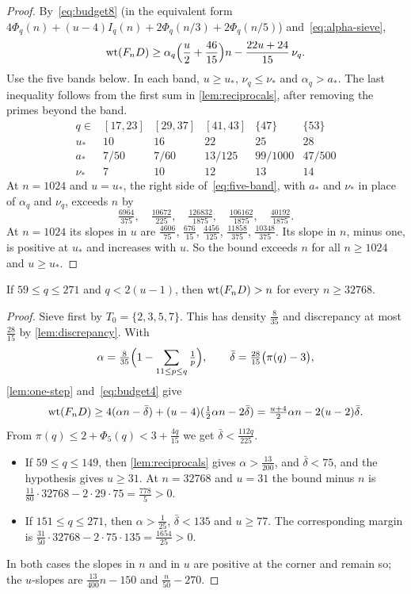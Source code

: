\begin{proof}
By~\eqref{eq:budget8} (in the equivalent form $4\Phi_q(n)+(u-4)I_q(n)+2\Phi_q(n/3)+2\Phi_q(n/5)$) and~\eqref{eq:alpha-sieve},
\begin{equation}\label{eq:five-band}
 \operatorname{wt}(F_nD)\ge\alpha_q\Bigl(\frac u2+\frac{46}{15}\Bigr)n-\frac{22u+24}{15}\,\nu_q .
\end{equation}
Use the five bands below. In each band, $u\ge u_*$, $\nu_q\le\nu_*$ and $\alpha_q>a_*$. The last inequality follows from the first sum in \cref{lem:reciprocals}, after removing the primes beyond the band.
\[
\begin{array}{c|ccccc}
q\in&[17,23]&[29,37]&[41,43]&\{47\}&\{53\}\\\hline
u_*&10&16&22&25&28\\
a_*&7/50&7/60&13/125&99/1000&47/500\\
\nu_*&7&10&12&13&14
\end{array}
\]
At $n=1024$ and $u=u_*$, the right side of~\eqref{eq:five-band}, with $a_*$ and $\nu_*$ in place of $\alpha_q$ and $\nu_q$, exceeds $n$ by
\[
 \tfrac{6964}{375},\quad\tfrac{10672}{225},\quad\tfrac{126832}{1875},\quad\tfrac{106162}{1875},\quad\tfrac{40192}{1875}.
\]
At $n=1024$ its slopes in $u$ are $\frac{4606}{75}$, $\frac{676}{15}$, $\frac{4456}{125}$, $\frac{11858}{375}$, $\frac{10348}{375}$. Its slope in $n$, minus one, is positive at $u_*$ and increases with $u$. So the bound exceeds $n$ for all $n\ge1024$ and $u\ge u_*$.
\end{proof}

\begin{lemma}\label{lem:middle}
If $59\le q\le271$ and $q<2(u-1)$, then $\operatorname{wt}(F_nD)>n$ for every $n\ge32768$.
\end{lemma}

\begin{proof}
Sieve first by $T_0=\{2,3,5,7\}$. This has density $\frac8{35}$ and discrepancy at most $\frac{28}{15}$ by \cref{lem:discrepancy}. With
\[
 \alpha=\tfrac8{35}\Bigl(1-\sum_{11\le p\le q}\tfrac1p\Bigr),\qquad \bar\delta=\tfrac{28}{15}\bigl(\pi(q)-3\bigr),
\]
\cref{lem:one-step} and~\eqref{eq:budget4} give
\[
 \operatorname{wt}(F_nD)\ge4(\alpha n-\bar\delta)+(u-4)(\tfrac12\alpha n-2\bar\delta)=\tfrac{u+4}2\alpha n-2(u-2)\bar\delta .
\]
From $\pi(q)\le2+\Phi_5(q)<3+\frac{4q}{15}$ we get $\bar\delta<\frac{112q}{225}$.
\begin{itemize}
\item If $59\le q\le149$, then \cref{lem:reciprocals} gives $\alpha>\frac{13}{200}$, and $\bar\delta<75$, and the hypothesis gives $u\ge31$. At $n=32768$ and $u=31$ the bound minus $n$ is $\frac{11}{80}\cdot32768-2\cdot29\cdot75=\frac{778}5>0$.
\item If $151\le q\le271$, then $\alpha>\frac1{25}$, $\bar\delta<135$ and $u\ge77$. The corresponding margin is $\frac{31}{50}\cdot32768-2\cdot75\cdot135=\frac{1654}{25}>0$.
\end{itemize}
In both cases the slopes in $n$ and in $u$ are positive at the corner and remain so; the $u$-slopes are $\frac{13}{400}n-150$ and $\frac{n}{50}-270$.
\end{proof}

